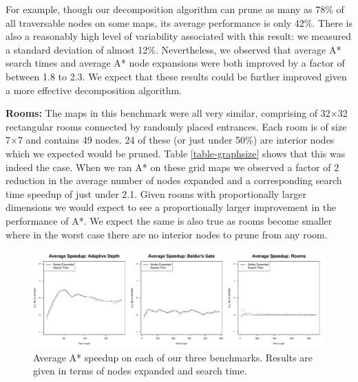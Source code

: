 For example, though our decomposition algorithm can prune as many as 78\% of all
traversable nodes on some maps, its average performance is only
42\%.  There is also a reasonably high level of variability associated with this result:
we measured a standard deviation of almost 12\%. 
Nevertheless, we observed that average A* search times and average A* node expansions
were both improved by a factor of between 1.8 to 2.3. 
We expect that these results could be
further improved given a more effective decomposition algorithm.
\par 
\textbf{Rooms:} 
The maps in this benchmark were all very similar, comprising of
32$\times$32 rectangular rooms connected by randomly placed entrances.
Each room is of size 7$\times$7 and contains 49 nodes.  
24 of these
(or just under 50\%) are interior nodes which we expected would be
pruned.  
Table \ref{table-graphsize} shows that this was indeed the case.
When we ran A* on these grid maps we observed a factor of 2 reduction 
in the average number of nodes expanded and a corresponding search time
speedup of just under 2.1.
Given rooms with proportionally larger dimensions
we would expect to see a proportionally larger improvement in the
performance of A*.  We expect the same is also true as rooms become
smaller where in the worst case there are no interior nodes to prune
from any room.

\begin{figure}[t]
       \begin{center}
                       \includegraphics[width=1.95\columnwidth, trim = 10mm 10mm 10mm 0mm]{diagrams/speedup.pdf}
       \end{center}
       \caption{Average A* speedup on each of our three benchmarks. 
		Results are given in terms of nodes expanded and search time.}
\label{fig-speedup}
\end{figure}
